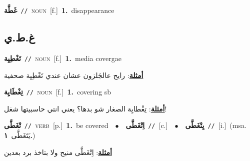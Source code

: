\documentclass[10pt,a4paper,twoside]{article} %
\begin{document}
\begin{multicols}{2}
{\setlength\topsep{0pt}\textbf{\foreignlanguage{arabic}{غَطَّة}}\ {\color{gray}\texttt{//}\color{black}}\ \textsc{noun}\ [f.]\ \textbf{1.}~disappearance\ } \vspace{2mm}

\vspace{-3mm}
\subsection*{\color{blue}\foreignlanguage{arabic}{غ.ط.ي}\color{blue}{}} 

{\setlength\topsep{0pt}\textbf{\foreignlanguage{arabic}{تَغْطِيِة}}\ {\color{gray}\texttt{//}\color{black}}\ \textsc{noun}\ [f.]\ \textbf{1.}~media covergae\  \begin{flushright}\color{gray}\foreignlanguage{arabic}{\textbf{\underline{\foreignlanguage{arabic}{أمثلة}}}: رايح عالجَلزون عشان عندي تَغْطِيِة صحفية}\end{flushright}\color{black}} \vspace{2mm}

{\setlength\topsep{0pt}\textbf{\foreignlanguage{arabic}{تِغْطَايِة}}\ {\color{gray}\texttt{//}\color{black}}\ \textsc{noun}\ [f.]\ \textbf{1.}~covering sb\  \begin{flushright}\color{gray}\foreignlanguage{arabic}{\textbf{\underline{\foreignlanguage{arabic}{أمثلة}}}: تِغْطايِة الصغار شو بدها؟ يعني انتي حاسبيتها شغل!}\end{flushright}\color{black}} \vspace{2mm}

{\setlength\topsep{0pt}\textbf{\foreignlanguage{arabic}{تْغَطَّى}}\ {\color{gray}\texttt{//}\color{black}}\ \textsc{verb}\ [p.]\ \textbf{1.}~be covered\ \ $\bullet$\ \ \setlength\topsep{0pt}\textbf{\foreignlanguage{arabic}{اِتْغَطَّى}}\ {\color{gray}\texttt{//}\color{black}}\ [c.]\ \ $\bullet$\ \ \setlength\topsep{0pt}\textbf{\foreignlanguage{arabic}{يِتْغَطَّى}}\ {\color{gray}\texttt{//}\color{black}}\ [i.]\ \color{gray}(msa. \foreignlanguage{arabic}{يَتَغَطَّى}~\foreignlanguage{arabic}{\textbf{١.}})\color{black}\  \begin{flushright}\color{gray}\foreignlanguage{arabic}{\textbf{\underline{\foreignlanguage{arabic}{أمثلة}}}: اِتْغَطَّى منيح ولا بتاخذ برد بعدين}\end{flushright}\color{black}} \vspace{2mm}


\end{multicols}
\end{document}
